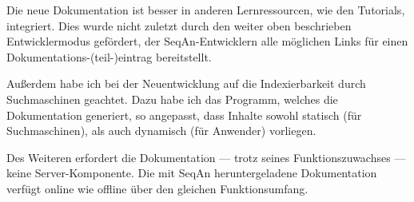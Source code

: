 Die neue Dokumentation ist besser in anderen Lernressourcen, wie den Tutorials, integriert. Dies wurde nicht zuletzt durch den weiter oben beschrieben Entwicklermodus gefördert, der SeqAn-Entwicklern alle möglichen Links für einen Dokumentations-(teil-)eintrag bereitstellt.  

Außerdem habe ich bei der Neuentwicklung auf die Indexierbarkeit durch Suchmaschinen geachtet. Dazu habe ich das Programm, welches die Dokumentation generiert, so angepasst, dass Inhalte sowohl statisch (für Suchmaschinen), als auch dynamisch (für Anwender) vorliegen.

Des Weiteren erfordert die Dokumentation --- trotz seines Funktionszuwachses --- keine Server-Komponente. Die mit SeqAn heruntergeladene Dokumentation verfügt online wie offline über den gleichen Funktionsumfang.







